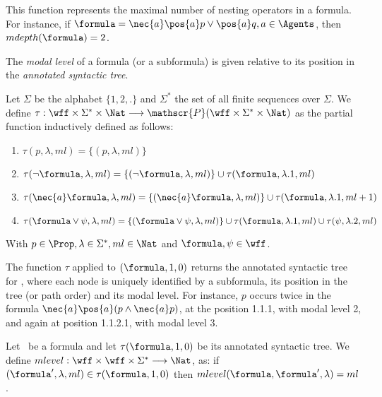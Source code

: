 This function represents the maximal number of nesting operators in a formula.
For instance, if $\formula = \nec{a}\pos{a} p \lor \pos{a} q, a \in \Agents$,
then $mdepth(\formula) = 2$.

The \emph{modal level} of a formula (or a subformula) is given relative to its position in the
\emph{annotated syntactic tree}.

\begin{definition}%
    Let $\Sigma$ be the alphabet $\{1, 2,.\}$ and $\Sigma^*$ the set of all
    finite sequences over $\Sigma$. 
    We define $\tau : \wff \times \Sigma^* \times \Nat
    \longrightarrow \mathscr{P}(\wff \times \Sigma^* \times \Nat)$ as the
    partial function inductively defined as follows:
    \begin{enumerate}
        \item $\tau(p, \lambda, ml) = \{(p, \lambda, ml)\}$
        \item $\tau(\neg \formula, \lambda, ml) = \{(\neg \formula, \lambda, ml)\} \cup \tau(\formula, \lambda.1, ml)$
        \item $\tau(\nec{a} \formula, \lambda, ml) = \{(\nec{a} \formula, \lambda, ml)\} \cup \tau(\formula, \lambda.1, ml + 1)$
        \item $\tau(\formula \lor \psi, \lambda, ml) = \{(\formula \lor \psi, \lambda, ml)\} \cup \tau(\formula, \lambda.1, ml) \cup \tau(\psi, \lambda.2, ml)$
    \end{enumerate}
    With $p \in \Prop, \lambda \in \Sigma^*, ml \in \Nat$ and $\formula, \psi
    \in \wff$.
\end{definition}

The function $\tau$ applied to $(\formula, 1, 0)$ returns the
annotated syntactic tree for \formula, where each node is uniquely identified by
a subformula, its position in the tree (or path order) and its modal level. For
instance, $p$ occurs twice in the formula $\nec{a}\pos{a}(p \land \nec{a} p)$,
at the position 1.1.1, with modal level 2, and again at position
1.1.2.1, with modal level 3.

\begin{definition}
    Let \formula~be a formula and let $\tau(\formula, 1, 0)$ be its
    annotated syntactic tree. We define $mlevel : \wff \times \wff \times \Sigma^*
    \longrightarrow \Nat$, as: if $(\formula', \lambda, ml)\in \tau(\formula,
    1, 0)$ then $mlevel(\formula, \formula', \lambda) = ml$.
\end{definition}

